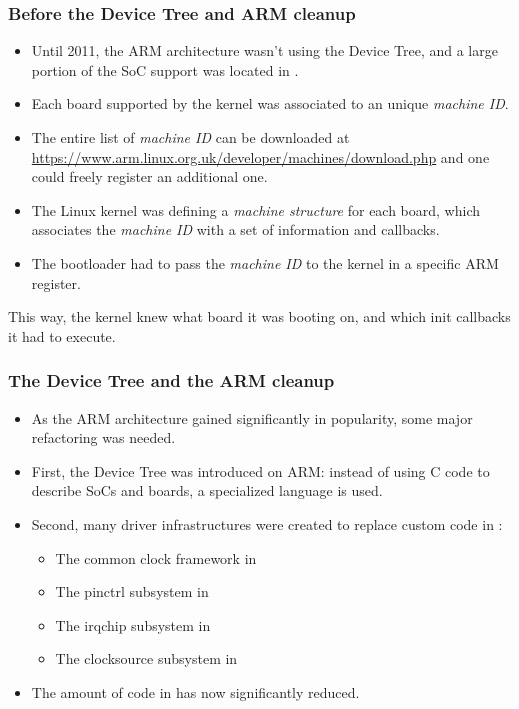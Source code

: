 \begin{frame}
  \frametitle{Before the Device Tree and ARM cleanup}
  \begin{itemize}
  \item Until 2011, the ARM architecture wasn't using the Device Tree,
    and a large portion of the SoC support was located in
    .
  \item Each board supported by the kernel was associated to an unique
    {\em machine ID}.
  \item The entire list of {\em machine ID} can be downloaded at
    \url{https://www.arm.linux.org.uk/developer/machines/download.php}
    and one could freely register an additional one.
  \item The Linux kernel was defining a {\em machine structure} for
    each board, which associates the {\em machine ID} with a set of
    information and callbacks.
  \item The bootloader had to pass the {\em machine ID} to the kernel
    in a specific ARM register.
  \end{itemize}
  This way, the kernel knew what board it was booting on,
  and which init callbacks it had to execute.
\end{frame}

\begin{frame}
  \frametitle{The Device Tree and the ARM cleanup}
  \begin{itemize}
  \item As the ARM architecture gained significantly in popularity,
    some major refactoring was needed.
  \item First, the Device Tree was introduced on ARM: instead of using
    C code to describe SoCs and boards, a specialized language is
    used.
  \item Second, many driver infrastructures were created to replace
    custom code in :
    \begin{itemize}
    \item The common clock framework in 
    \item The pinctrl subsystem in 
    \item The irqchip subsystem in 
    \item The clocksource subsystem in 
    \end{itemize}
  \item The amount of code in  has now significantly
    reduced.
  \end{itemize}
\end{frame}

